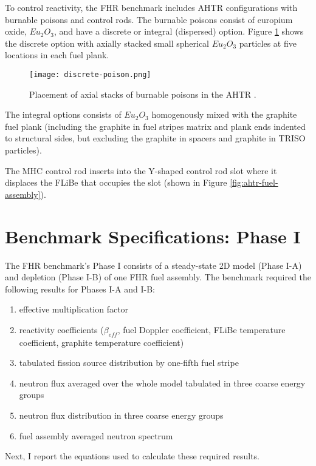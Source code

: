 To control reactivity, the \gls{FHR} benchmark includes \gls{AHTR} configurations
with burnable poisons and control rods. 
The burnable poisons consist of europium oxide, $Eu_2O_3$, and have a discrete
or integral (dispersed) option. 
Figure \ref{fig:discrete-poison} shows the discrete option with axially 
stacked small spherical $Eu_2O_3$ particles at five locations in each 
fuel plank. 
\begin{figure}[]
    \centering
    \texttt{[image: discrete-poison.png]}
    \caption{Placement of axial stacks of burnable poisons in the \acrlong{AHTR} 
    \cite{noauthor_fluoride_nodate}.}
    \label{fig:discrete-poison}
\end{figure}
The integral options consists of $Eu_2O_3$ homogenously mixed with the graphite 
fuel plank (including the graphite in fuel stripes matrix and plank ends 
indented to structural sides, but excluding the graphite in spacers and 
graphite in TRISO particles).

The \gls{MHC} control rod inserts into the Y-shaped control rod slot where it 
displaces the \gls{FLiBe} that occupies the slot 
(shown in Figure \ref{fig:ahtr-fuel-assembly}). 

\section{Benchmark Specifications: Phase I}
\label{sec:phase1}
The \gls{FHR} benchmark's Phase I consists of a steady-state 2D model 
(Phase I-A) and depletion (Phase I-B) of one \gls{FHR} fuel assembly. 
The benchmark required the following results for Phases I-A and I-B:
\begin{enumerate}[label=(\alph*)]
    \item effective multiplication factor 
    \item reactivity coefficients ($\beta_{eff}$, fuel Doppler coefficient, FLiBe 
    temperature coefficient, graphite temperature coefficient)
    \item tabulated fission source distribution by one-fifth fuel stripe
    \item neutron flux averaged over the whole model tabulated in three coarse energy groups
    \item neutron flux distribution in three coarse energy groups
    \item fuel assembly averaged neutron spectrum
\end{enumerate}
Next, I report the equations used to calculate these required results.  

